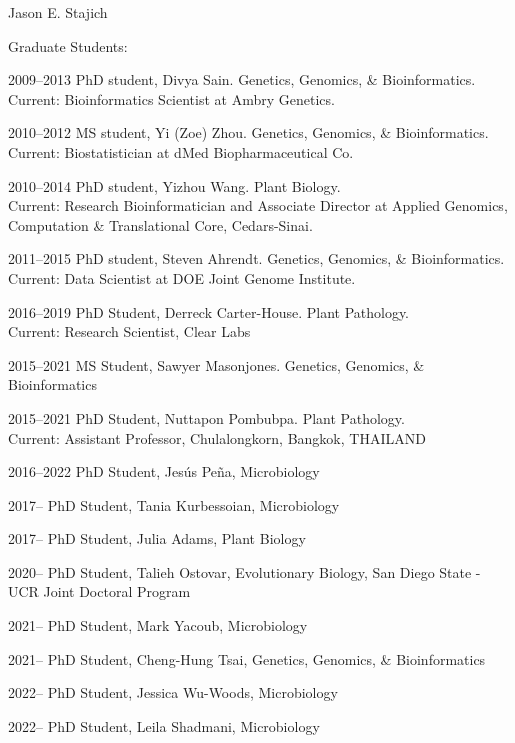\documentclass[10pt]{article}
\begin{document}
\begin{cv}{\centerline{Jason E. Stajich}}
\begin{cvlistcompact}{Graduate Students:}
\item [2009--2013] PhD student, Divya Sain. Genetics, Genomics, \&
  Bioinformatics. \\ Current: Bioinformatics Scientist at Ambry Genetics.
\item [2010--2012] MS student, Yi (Zoe) Zhou. Genetics, Genomics, \&
  Bioinformatics. \\ Current: Biostatistician at dMed Biopharmaceutical Co.
\item [2010--2014] PhD student, Yizhou Wang. Plant Biology. \\ Current:
  Research Bioinformatician and Associate Director at Applied Genomics, Computation \& Translational Core, Cedars-Sinai.
\item [2011--2015] PhD student, Steven Ahrendt. Genetics, Genomics, \&
  Bioinformatics. \\ Current: Data Scientist at DOE Joint Genome Institute.
\item [2016--2019] PhD Student, Derreck Carter-House. Plant Pathology. \\ Current: Research Scientist, Clear Labs
\item [2015--2021] MS Student, Sawyer Masonjones. Genetics, Genomics, \&
  Bioinformatics
\item [2015--2021] PhD Student, Nuttapon Pombubpa. Plant Pathology. \\ Current: Assistant Professor, Chulalongkorn, Bangkok, THAILAND
\item [2016--2022] PhD Student, Jes\'{u}s Pe\~{n}a, Microbiology
\item [2017--] PhD Student, Tania Kurbessoian, Microbiology
\item [2017--] PhD Student, Julia Adams, Plant Biology
\item [2020--] PhD Student, Talieh Ostovar, Evolutionary Biology, San Diego State - UCR Joint Doctoral Program
\item [2021--] PhD Student, Mark Yacoub, Microbiology
\item [2021--] PhD Student, Cheng-Hung Tsai, Genetics, Genomics, \& Bioinformatics
\item [2022--] PhD Student, Jessica Wu-Woods, Microbiology
\item [2022--] PhD Student, Leila Shadmani, Microbiology
\end{cvlistcompact}


\end{cv}
\end{document}
